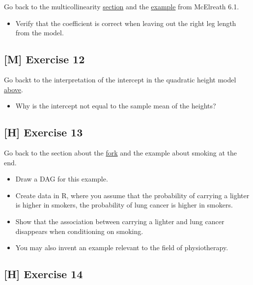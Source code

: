 \documentclass[
]{book}
\providecommand{\tightlist}{%
  \setlength{\itemsep}{0pt}\setlength{\parskip}{0pt}}
\begin{document}
Go back to the multicollinearity \hyperref[multicollinearity]{section} and the \hyperref[mcElreath_6.1]{example}
from McElreath 6.1.

\begin{itemize}
\tightlist
\item
  Verify that the coefficient is correct when leaving out the right leg length from the model.
\end{itemize}

\subsection{{[}M{]} Exercise 12}\label{exercise12_multiple_regression}

Go backt to the interpretation of the intercept in the quadratic height model \hyperref[interpretation_output_freq_quadratic]{above}.

\begin{itemize}
\tightlist
\item
  Why is the intercept not equal to the sample mean of the heights?
\end{itemize}

\subsection{{[}H{]} Exercise 13}\label{exercise13_multiple_regression}

Go back to the section about the \hyperref[fork]{fork} and the example about smoking at the end.

\begin{itemize}
\tightlist
\item
  Draw a DAG for this example.
\item
  Create data in R, where you assume that the probability of carrying a lighter is higher in smokers,
  the probability of lung cancer is higher in smokers.
\item
  Show that the association between carrying a lighter and lung cancer disappears when conditioning on smoking.
\item
  You may also invent an example relevant to the field of physiotherapy.
\end{itemize}

\subsection{{[}H{]} Exercise 14}\label{exercise14_multiple_regression}
\end{document}
